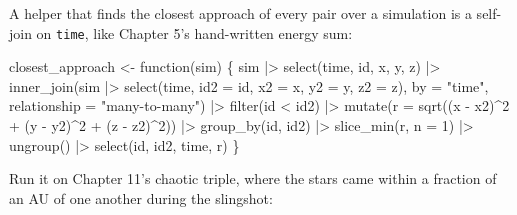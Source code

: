 \documentclass[
  10.5pt,
  letterpaper,
]{scrbook}
\newenvironment{Shaded}{\begin{snugshade}}{\end{snugshade}}
\newcommand{\AttributeTok}[1]{\textcolor[rgb]{0.00,0.00,0.00}{#1}}
\newcommand{\ControlFlowTok}[1]{\textcolor[rgb]{0.00,0.00,0.00}{#1}}
\newcommand{\DecValTok}[1]{\textcolor[rgb]{0.00,0.00,0.00}{#1}}
\newcommand{\FunctionTok}[1]{\textcolor[rgb]{0.00,0.00,0.00}{#1}}
\newcommand{\NormalTok}[1]{\textcolor[rgb]{0.00,0.00,0.00}{#1}}
\newcommand{\OtherTok}[1]{\textcolor[rgb]{0.00,0.00,0.00}{#1}}
\newcommand{\SpecialCharTok}[1]{\textcolor[rgb]{0.00,0.00,0.00}{#1}}
\newcommand{\StringTok}[1]{\textcolor[rgb]{0.00,0.00,0.00}{#1}}
\theoremstyle{plain}
\theoremstyle{remark}
\begin{document}
A helper that finds the closest approach of every pair over a simulation
is a self-join on \texttt{time}, like Chapter 5's hand-written energy
sum:

\begin{Shaded}
\begin{Highlighting}[]
\NormalTok{closest\_approach }\OtherTok{\textless{}{-}} \ControlFlowTok{function}\NormalTok{(sim) \{}
\NormalTok{  sim }\SpecialCharTok{|\textgreater{}}
    \FunctionTok{select}\NormalTok{(time, id, x, y, z) }\SpecialCharTok{|\textgreater{}}
    \FunctionTok{inner\_join}\NormalTok{(sim }\SpecialCharTok{|\textgreater{}} \FunctionTok{select}\NormalTok{(time, }\AttributeTok{id2 =}\NormalTok{ id, }\AttributeTok{x2 =}\NormalTok{ x, }\AttributeTok{y2 =}\NormalTok{ y, }\AttributeTok{z2 =}\NormalTok{ z),}
               \AttributeTok{by =} \StringTok{"time"}\NormalTok{, }\AttributeTok{relationship =} \StringTok{"many{-}to{-}many"}\NormalTok{) }\SpecialCharTok{|\textgreater{}}
    \FunctionTok{filter}\NormalTok{(id }\SpecialCharTok{\textless{}}\NormalTok{ id2) }\SpecialCharTok{|\textgreater{}}
    \FunctionTok{mutate}\NormalTok{(}\AttributeTok{r =} \FunctionTok{sqrt}\NormalTok{((x }\SpecialCharTok{{-}}\NormalTok{ x2)}\SpecialCharTok{\^{}}\DecValTok{2} \SpecialCharTok{+}\NormalTok{ (y }\SpecialCharTok{{-}}\NormalTok{ y2)}\SpecialCharTok{\^{}}\DecValTok{2} \SpecialCharTok{+}\NormalTok{ (z }\SpecialCharTok{{-}}\NormalTok{ z2)}\SpecialCharTok{\^{}}\DecValTok{2}\NormalTok{)) }\SpecialCharTok{|\textgreater{}}
    \FunctionTok{group\_by}\NormalTok{(id, id2) }\SpecialCharTok{|\textgreater{}}
    \FunctionTok{slice\_min}\NormalTok{(r, }\AttributeTok{n =} \DecValTok{1}\NormalTok{) }\SpecialCharTok{|\textgreater{}}
    \FunctionTok{ungroup}\NormalTok{() }\SpecialCharTok{|\textgreater{}}
    \FunctionTok{select}\NormalTok{(id, id2, time, r)}
\NormalTok{\}}
\end{Highlighting}
\end{Shaded}

Run it on Chapter 11's chaotic triple, where the stars came within a
fraction of an AU of one another during the slingshot:
\end{document}
